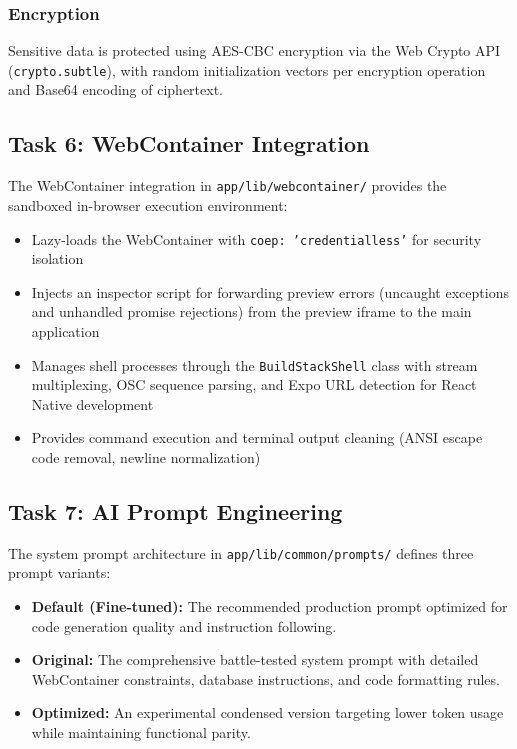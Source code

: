 \documentclass[12pt,a4paper,openany]{report}
\begin{document}
\subsubsection{Encryption}
Sensitive data is protected using AES-CBC encryption via the Web Crypto API (\texttt{crypto.subtle}), with random initialization vectors per encryption operation and Base64 encoding of ciphertext.

\subsection{Task 6: WebContainer Integration}

The WebContainer integration in \texttt{app/lib/webcontainer/} provides the sandboxed in-browser execution environment:
\begin{itemize}
    \item Lazy-loads the WebContainer with \texttt{coep: 'credentialless'} for security isolation
    \item Injects an inspector script for forwarding preview errors (uncaught exceptions and unhandled promise rejections) from the preview iframe to the main application
    \item Manages shell processes through the \texttt{BuildStackShell} class with stream multiplexing, OSC sequence parsing, and Expo URL detection for React Native development
    \item Provides command execution and terminal output cleaning (ANSI escape code removal, newline normalization)
\end{itemize}

\subsection{Task 7: AI Prompt Engineering}

The system prompt architecture in \texttt{app/lib/common/prompts/} defines three prompt variants:
\begin{itemize}
    \item \textbf{Default (Fine-tuned):} The recommended production prompt optimized for code generation quality and instruction following.
    \item \textbf{Original:} The comprehensive battle-tested system prompt with detailed WebContainer constraints, database instructions, and code formatting rules.
    \item \textbf{Optimized:} An experimental condensed version targeting lower token usage while maintaining functional parity.
\end{itemize}
\end{document}
